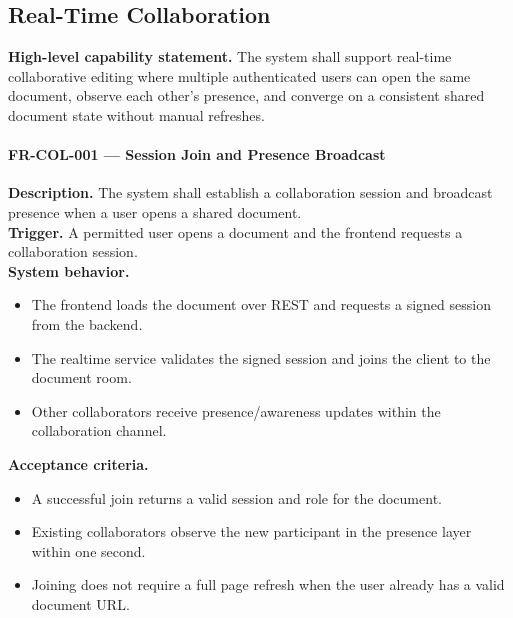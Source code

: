 \subsection{Real-Time Collaboration}

\textbf{High-level capability statement.} The system shall support real-time collaborative editing
where multiple authenticated users can open the same document, observe each other's presence, and
converge on a consistent shared document state without manual refreshes.

\paragraph{FR-COL-001 --- Session Join and Presence Broadcast}
\textbf{Description.} The system shall establish a collaboration session and broadcast presence when a
user opens a shared document.\\
\textbf{Trigger.} A permitted user opens a document and the frontend requests a collaboration session.\\
\textbf{System behavior.}
\begin{itemize}
  \item The frontend loads the document over REST and requests a signed session from the backend.
  \item The realtime service validates the signed session and joins the client to the document room.
  \item Other collaborators receive presence/awareness updates within the collaboration channel.
\end{itemize}
\textbf{Acceptance criteria.}
\begin{itemize}
  \item A successful join returns a valid session and role for the document.
  \item Existing collaborators observe the new participant in the presence layer within one second.
  \item Joining does not require a full page refresh when the user already has a valid document URL.
\end{itemize}

